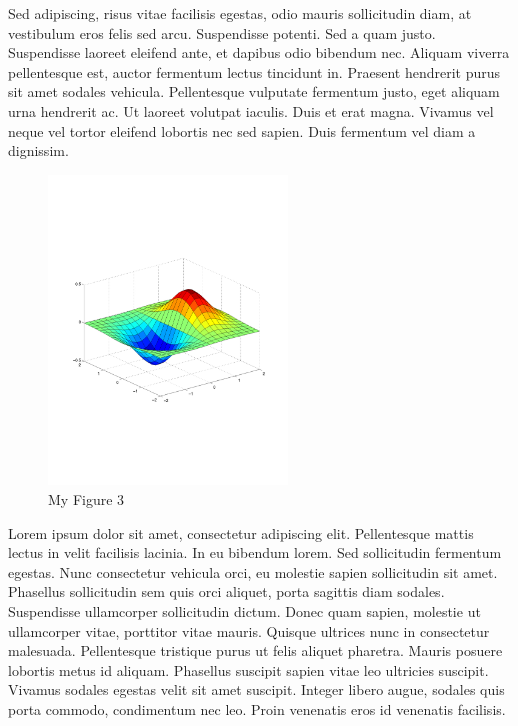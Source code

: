 Sed adipiscing, risus vitae facilisis egestas, odio mauris sollicitudin diam, at vestibulum eros felis sed arcu. Suspendisse potenti. Sed a quam justo. Suspendisse laoreet eleifend ante, et dapibus odio bibendum nec. Aliquam viverra pellentesque est, auctor fermentum lectus tincidunt in. Praesent hendrerit purus sit amet sodales vehicula. Pellentesque vulputate fermentum justo, eget aliquam urna hendrerit ac. Ut laoreet volutpat iaculis. Duis et erat magna. Vivamus vel neque vel tortor eleifend lobortis nec sed sapien. Duis fermentum vel diam a dignissim. 

\begin{figure}[h!]
	\begin{center}
		\includegraphics[width=2.5in]{./images/sample.pdf}
		\caption{My Figure 3}
		\label{fig:MyFigure3}
	\end{center}
\end{figure}

Lorem ipsum dolor sit amet, consectetur adipiscing elit. Pellentesque mattis lectus in velit facilisis lacinia. In eu bibendum lorem. Sed sollicitudin fermentum egestas. Nunc consectetur vehicula orci, eu molestie sapien sollicitudin sit amet. Phasellus sollicitudin sem quis orci aliquet, porta sagittis diam sodales. Suspendisse ullamcorper sollicitudin dictum. Donec quam sapien, molestie ut ullamcorper vitae, porttitor vitae mauris. Quisque ultrices nunc in consectetur malesuada. Pellentesque tristique purus ut felis aliquet pharetra. Mauris posuere lobortis metus id aliquam. Phasellus suscipit sapien vitae leo ultricies suscipit. Vivamus sodales egestas velit sit amet suscipit. Integer libero augue, sodales quis porta commodo, condimentum nec leo. Proin venenatis eros id venenatis facilisis.

